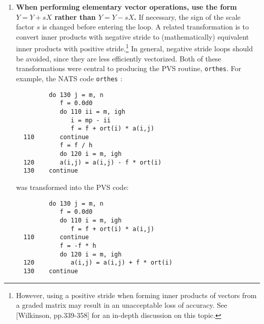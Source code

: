 \begin{enumerate}
 It is possible, in this case, to perform computation and testing in separate
 loops without duplicating any computation.  Thus, at least the computation
 loop may be vectorized.  The only expense is that when bad input is detected,
 more computation will have been performed before returning,
 since the computation loop must precede the loop for input validation.
 The net performance gain for this transformation is an average of about
 50\% for $N$ in the range $50$ to $150$.

\begin{verbatim}
      d(1) = t(1,2)
      do 100 i = 2, n
         e2(i) = t(i,1) * t(i-1,3)
         e(i) = sqrt(abs(e2(i)))
         d(i) = t(i,2)
  100 continue
      do 200 i = 2, n
         if (e2(i) .gt. 0.e0) go to 200
            if (e2(i) .lt. 0.e0) go to 1000
               if (t(i,1).eq.0.e0.and.t(i-1,3).eq.0.e0) go to 200
               ierr = -(3 * n + i)
  200 continue
\end{verbatim}

 \item {\bf When performing elementary vector operations, use the form
 $Y = Y + sX$ rather than $Y = Y - sX$.}  If necessary, the sign of the
 scale factor $s$ is changed before entering the loop.  A related
 transformation is to convert inner products with negative stride to
 (mathematically) equivalent inner products with positive stride.\footnote
 {However, using a positive stride when forming inner products of
 vectors from a graded matrix may result in an unacceptable loss of accuracy.
 See [Wilkinson, pp.339-358]
 for an in-depth discussion on this topic.}
 In general, negative stride loops should be avoided, since they are less
 efficiently vectorized.
 Both of these transformations were central to producing the PVS routine,
 {\tt orthes}.
 For example, the NATS code {\tt orthes} :
\begin{verbatim}
         do 130 j = m, n
            f = 0.0d0
            do 110 ii = m, igh
               i = mp - ii
               f = f + ort(i) * a(i,j)
  110       continue
            f = f / h
            do 120 i = m, igh
  120       a(i,j) = a(i,j) - f * ort(i)
  130    continue
\end{verbatim}
 was transformed into the PVS code:
\begin{verbatim}
         do 130 j = m, n
            f = 0.0d0
            do 110 i = m, igh
               f = f + ort(i) * a(i,j)
  110       continue
            f = -f * h
            do 120 i = m, igh
  120          a(i,j) = a(i,j) + f * ort(i)
  130    continue
\end{verbatim}


\end{enumerate}
